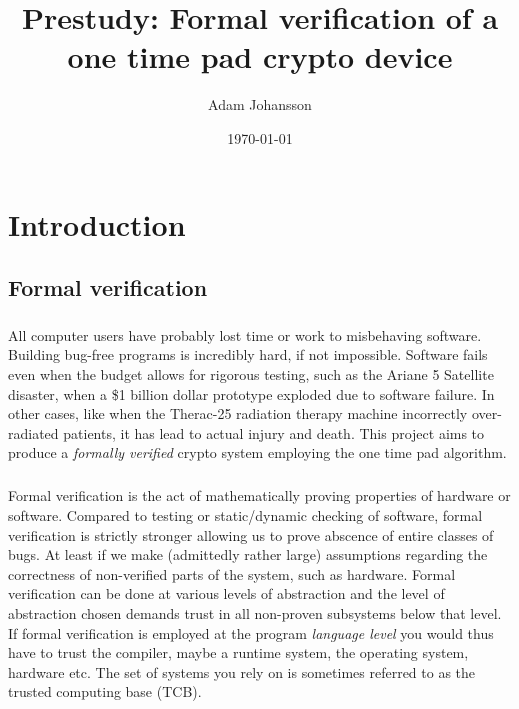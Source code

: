 \documentclass[fleqn]{kththesis}
\title{Prestudy: Formal verification of a one time pad crypto device}
\author{Adam Johansson}
\date{\today}
\begin{document}
\frontmatter

\titlepage




\tableofcontents


\mainmatter


\chapter{Introduction}

\section{Formal verification}
\paragraph{}
All computer users have probably lost time or work to misbehaving software. Building bug-free programs is incredibly hard, if not impossible. Software fails even when the budget allows for rigorous testing, such as the Ariane 5 Satellite disaster, when a \$1 billion dollar prototype exploded due to software failure. In other cases, like when the Therac-25 radiation therapy machine incorrectly over-radiated patients, it has lead to actual injury and death. This project aims to produce a \emph{formally verified} crypto system employing the one time pad algorithm. 

\paragraph{}
Formal verification is the act of mathematically proving properties of hardware or software. Compared to testing or static/dynamic checking of software, formal verification is strictly stronger allowing us to prove abscence of entire classes of bugs. At least if we make (admittedly rather large) assumptions regarding the correctness of non-verified parts of the system, such as hardware. Formal verification can be done at various levels of abstraction and the level of abstraction chosen demands trust in all non-proven subsystems below that level. If formal verification is employed at the program \emph{language level} you would thus have to trust the compiler, maybe a runtime system, the operating system, hardware etc. The set of systems you rely on is sometimes referred to as the trusted computing base (TCB). %
\end{document}

